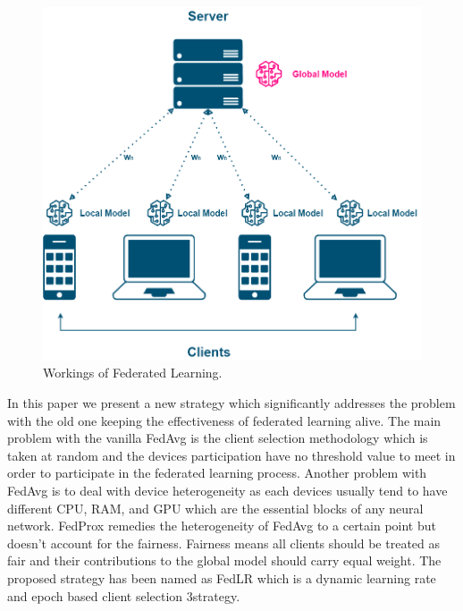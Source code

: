 \documentclass[conference]{IEEEtran}
\begin{document}
\begin{figure}[htp!]
	\centering
	\includegraphics[scale=.25]{Images/FEDLEARN_NEW}
	\caption{Workings of Federated Learning.}
	\label{fig1}
\end{figure}

 In this paper we present a new strategy which significantly addresses the problem with the old one keeping the effectiveness of federated learning alive. The main problem with the vanilla FedAvg is the client selection methodology which is taken at random and the devices participation have no threshold value to meet in order to participate in the federated learning process. Another problem with FedAvg is to deal with device heterogeneity as each devices usually tend to have different CPU, RAM, and GPU which are the essential blocks of any neural network. FedProx \cite{li2020federated} remedies the heterogeneity of FedAvg to a certain point but doesn't account for the fairness. Fairness means all clients should be treated as fair and their contributions to the global model should carry equal weight. The proposed strategy has been named as FedLR which is a dynamic learning rate and epoch based client  selection 3strategy.
 
\end{document}
